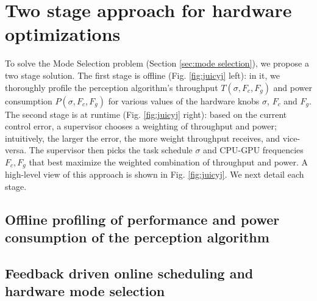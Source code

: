 \section{Two stage approach for hardware optimizations}
\label{sec:twoStage}
To solve the Mode Selection problem (Section \ref{sec:mode selection}), we propose a two stage solution. 
The first stage is offline (Fig. \ref{fig:juicyj} left): in it, we thoroughly profile the perception algorithm's throughput $T(\sigma,F_c,F_g)$ and power consumption $P(\sigma,F_c,F_g)$ for various values of the hardware knobs $\sigma$, $F_c$ and $F_g$. 
The second stage is at runtime (Fig. \ref{fig:juicyj} right): based on the current control error, a supervisor chooses a weighting of throughput and power; intuitively, the larger the error, the more weight throughput receives, and vice-versa.
The supervisor then picks the task schedule $\sigma$ and CPU-GPU frequencies $F_c,F_g$ that best maximize the weighted combination of throughput and power.
A high-level view of this approach is shown in Fig. \ref{fig:juicyj}. 
We next detail each stage.

\subsection{Offline profiling of performance and power consumption of the perception algorithm}
\label{sec:profiling}


\subsection{Feedback driven online scheduling and hardware mode selection}
\label{sec:scheduling}

